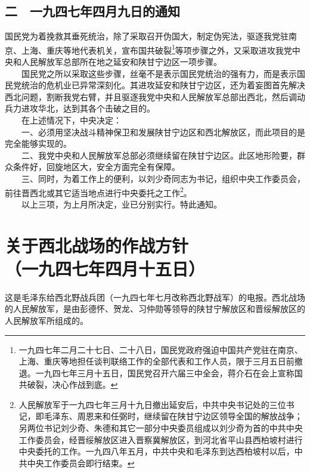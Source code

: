 \documentclass[cn,11pt,chinese]{elegantbook}
\def\myformat#1{\hfil\hfil #1}
\begin{document}
\subsection*{\myformat{二　一九四七年四月九日的通知}}
国民党为着挽救其垂死统治，除了采取召开伪国大，制定伪宪法，驱逐我党驻南京、上海、重庆等地代表机关，宣布国共破裂\footnote[3]{ 一九四七年二月二十七日、二十八日，国民党政府强迫中国共产党驻在南京、上海、重庆等地担任谈判联络工作的全部代表和工作人员，限于三月五日前撤退。一九四七年三月十五日，国民党召开六届三中全会，蒋介石在会上宣称国共破裂，决心作战到底。}等项步骤之外，又采取进攻我党中央和人民解放军总部所在地之延安和陕甘宁边区一项步骤。\\
　　国民党之所以采取这些步骤，丝毫不是表示国民党统治的强有力，而是表示国民党统治的危机业已异常深刻化。其进攻延安和陕甘宁边区，还为着妄图首先解决西北问题，割断我党右臂，并且驱逐我党中央和人民解放军总部出西北，然后调动兵力进攻华北，达到其各个击破之目的。\\
　　在上述情况下，中央决定：\\
　　一、必须用坚决战斗精神保卫和发展陕甘宁边区和西北解放区，而此项目的是完全能够实现的。\\
　　二、我党中央和人民解放军总部必须继续留在陕甘宁边区。此区地形险要，群众条件好，回旋地区大，安全方面完全有保障。\\
　　三、同时，为着工作上的便利，以刘少奇同志为书记，组织中央工作委员会，前往晋西北或其它适当地点进行中央委托之工作\footnote[4]{ 人民解放军于一九四七年三月十九日撤出延安后，中共中央书记处的三位书记，即毛泽东、周恩来和任弼时，继续留在陕甘宁边区领导全国的解放战争；另两位书记刘少奇、朱德和其它一部分中央委员组成以刘少奇为首的中共中央工作委员会，经晋绥解放区进入晋察冀解放区，到河北省平山县西柏坡村进行中央委托的工作。一九四八年五月，中共中央和毛泽东到达西柏坡村以后，中共中央工作委员会即行结束。}。\\
　　以上三项，为上月所决定，业已分别实行。特此通知。\\
\newpage\section*{\myformat{关于西北战场的作战方针}\\\myformat{（一九四七年四月十五日）}}
\begin{introduction}\item  这是毛泽东给西北野战兵团（一九四七年七月改称西北野战军）的电报。西北战场的人民解放军，是由彭德怀、贺龙、习仲勋等领导的陕甘宁解放区和晋绥解放区的人民解放军所组成的。\end{introduction}
\end{document}
